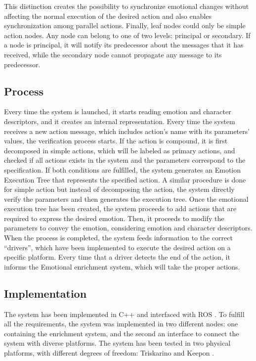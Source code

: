 \documentclass{sig-alternate-05-2015}
\begin{document}
This distinction creates the possibility to synchronize emotional changes without affecting the normal execution of the desired action and also enables synchronization among parallel actions. Finally, leaf nodes could only be simple action nodes. Any node can belong to one of two levels: principal or  secondary. If a node is principal, it will notify its predecessor about the messages that it has received, while the secondary node cannot propagate any message to its predecessor.

\subsection{Process}

Every time the system is launched, it starts reading emotion and character descriptors, and it creates an internal representation. %
Every time the system receives a new action message, which includes action's name with its parameters' values, the verification process starts. If the action is compound, it is first decomposed in simple actions, which will be labeled as primary actions, and checked if all actions exists in the system and the parameters correspond to the specification. If both conditions are fulfilled, the system generates an Emotion Execution Tree that represents the specified action. A similar procedure is done for simple action but instead of decomposing the action, the system directly verify the parameters and then generates the execution tree. Once the emotional execution tree has been created, the system proceeds to add actions that are required to express the desired emotion. Then, it proceeds to modify the parameters to convey the emotion, considering emotion and character descriptors. When the process is completed, the system feeds information to the correct ``drivers'', which have been implemented to execute the desired action on a specific platform. Every time that a driver detects the end of the action, it informs the Emotional enrichment system, which will take the proper actions.

\subsection{Implementation}

The system has been implemented in C++ and interfaced with ROS %
. To fulfill all the requirements, the system was implemented in two different nodes: one containing the enrichment system, and the second an interface to connect the system with diverse platforms. The system has been tested in two physical platforms, with different degrees of freedom: Triskarino%
 and Keepon%
 . 
\end{document}
